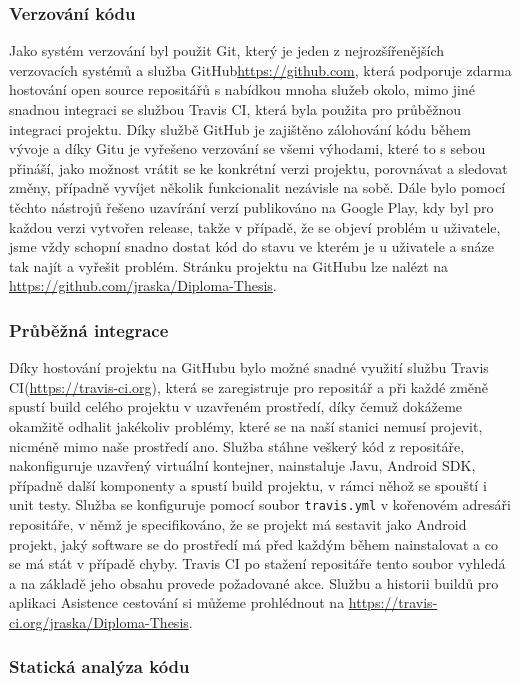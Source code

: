 \documentclass[czech,master,public,dept460,male,java,cpdeclaration]{diploma}
\begin{document}
 \subsubsection{Verzování kódu}
 Jako systém verzování byl použit Git, který je jeden z nejrozšířenějších verzovacích systémů a služba GitHub\url{https://github.com},
 která podporuje zdarma hostování open source repositářů s nabídkou mnoha služeb okolo, mimo jiné snadnou integraci se službou
 Travis CI, která byla použita pro průběžnou integraci projektu. Díky službě GitHub je zajištěno zálohování kódu
 během vývoje a díky Gitu je vyřešeno verzování se všemi výhodami, které to s sebou přináší, jako možnost vrátit se
 ke konkrétní verzi projektu, porovnávat a sledovat změny, případně vyvíjet několik funkcionalit nezávisle na sobě.
 Dále bylo pomocí těchto nástrojů řešeno uzavírání verzí publikováno na Google Play, kdy byl pro každou verzi vytvořen
 release, takže v případě, že se objeví problém u uživatele, jsme vždy schopní snadno dostat kód do stavu
 ve kterém je u uživatele a snáze tak najít a vyřešit problém. Stránku projektu na GitHubu lze nalézt na
 \url{https://github.com/jraska/Diploma-Thesis}.

 \subsubsection{Průběžná integrace}
 Díky hostování projektu na GitHubu bylo možné snadné využití službu Travis CI(\url{https://travis-ci.org}),
 která se zaregistruje pro repositář
 a při každé změně spustí build celého projektu v uzavřeném prostředí, díky čemuž dokážeme okamžitě
 odhalit jakékoliv problémy, které se na naší stanici nemusí projevit, nicméně mimo naše prostředí ano.
 Služba stáhne veškerý kód z repositáře, nakonfiguruje uzavřený virtuální kontejner, nainstaluje Javu, Android SDK,
 případně další komponenty a spustí build projektu, v rámci něhož se spouští i unit testy. Služba se konfiguruje pomocí
 soubor \texttt{travis.yml} v kořenovém adresáři repositáře, v němž je specifikováno, že se projekt má sestavit jako Android projekt,
 jaký software se do prostředí má před každým během nainstalovat a co se má stát v případě chyby. Travis CI po stažení
 repositáře tento soubor vyhledá a na základě jeho obsahu provede požadované akce.
 Službu a historii buildů pro aplikaci Asistence cestování si můžeme prohlédnout na \url{https://travis-ci.org/jraska/Diploma-Thesis}.

 \subsubsection{Statická analýza kódu}
\end{document}
